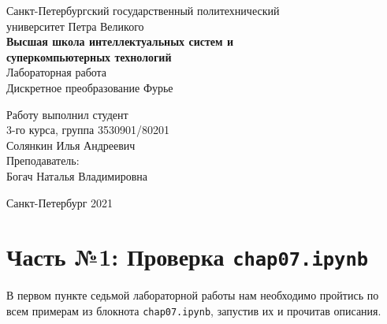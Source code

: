 \documentclass[a4paper]{article}
\begin{document}
    \begin{center}
        \begin{center}
        \hfill \break
        \normalsize{Санкт-Петербургский государственный политехнический}\\
        \normalsize{университет Петра Великого}\\
        \hfill \break
        \normalsize{\textbf{Высшая школа интеллектуальных систем и}}\\ 
        \normalsize{\textbf{суперкомпьютерных технологий}}\\ 
        \hfill \break
        \hfill \break
        \hfill \break
        \normalsize{Лабораторная работа}\\
        \hfill \break
        \hfill \break
        \normalsize{\LARGE Дискретное преобразование Фурье}\\
        \end{center}
        \hfill \break
        \hfill \break
        \hfill \break
        \hfill \break
        \hfill \break
        \hfill \break
        \hfill \break
        \hfill \break
        \hfill \break
        \hfill \break
        \begin{flushright}
            \normalsize{Работу выполнил студент}\\
            \normalsize{3-го курса, группа 3530901/80201}\\
            \normalsize{Солянкин Илья Андреевич}\\
            \hfill \break
            \normalsize{Преподаватель:}\\
            \normalsize{Богач Наталья Владимировна}\\
        \end{flushright}
        \hfill \break
        \hfill \break
        \hfill \break
        \hfill \break
        \begin{center} Санкт-Петербург 2021 \end{center}
        \thispagestyle{empty}
    \end{center}
    
    \newpage
        \tableofcontents
    
    \newpage
         \listoffigures
    
    \newpage
         \lstlistoflistings   
     
    \newpage
        \section{Часть №1: Проверка \texttt{chap07.ipynb}}
            В первом пункте седьмой лабораторной работы нам необходимо пройтись по всем примерам из блокнота \texttt{chap07.ipynb}, запустив их и прочитав описания.
            
\end{document}
